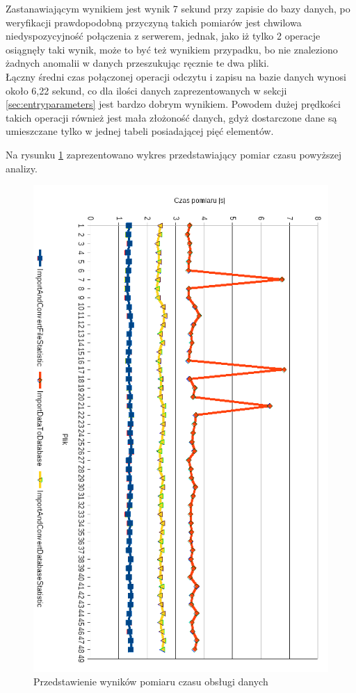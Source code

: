 Zastanawiającym wynikiem jest wynik 7 sekund przy zapisie do bazy danych, po weryfikacji prawdopodobną przyczyną takich pomiarów jest chwilowa niedyspozycyjność połączenia z serwerem, jednak, jako iż tylko 2 operacje osiągnęły taki wynik, może to być też wynikiem przypadku, bo nie znaleziono żadnych anomalii w danych przeszukując ręcznie te dwa pliki.\\
Łączny średni czas połączonej operacji odczytu i zapisu na bazie danych wynosi około 6,22 sekund, co dla ilości danych zaprezentowanych w sekcji \ref{sec:entryparameters} jest bardzo dobrym wynikiem. Powodem dużej prędkości takich operacji również jest mała złożoność danych, gdyż dostarczone dane są umieszczane tylko w jednej tabeli posiadającej pięć elementów.\par
Na rysunku \ref{fig:importdata} zaprezentowano wykres przedstawiający pomiar czasu powyższej analizy.
\newpage
\begin{figure}[H]
    \centering
    \captionsetup{justification=centering,margin=2cm}
    \includegraphics[width=\linewidth]{resources/statystyka_pomiaru.png}
    \caption{Przedstawienie wyników pomiaru czasu obsługi danych}
    \label{fig:importdata}
\end{figure}
